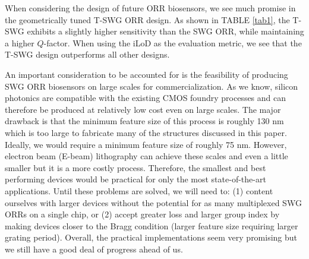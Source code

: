 \documentclass[aps,prl,twocolumn, superscriptaddress,nobalancelastpage]{revtex4}
\begin{document}
When considering the design of future ORR biosensors, we see much promise in the geometrically tuned T-SWG ORR design. As shown in TABLE \ref{tab1}, the T-SWG exhibits a slightly higher sensitivity than the SWG ORR, while maintaining a higher $Q$-factor. When using the iLoD as the evaluation metric, we see that the T-SWG design outperforms all other designs. 


An important consideration to be accounted for is the feasibility of producing SWG ORR biosensors on large scales for commercialization. As we know, silicon photonics are compatible with the existing CMOS foundry processes and can therefore be produced at relatively low cost even on large scales. The major drawback is that the minimum feature size of this process is roughly 130 nm which is too large to fabricate many of the structures discussed in this paper. Ideally, we would require a minimum feature size of roughly 75 nm. However, electron beam (E-beam) lithography can achieve these scales and even a little smaller but it is a more costly process. Therefore, the smallest and best performing devices would be practical for only the most state-of-the-art applications. Until these problems are solved, we will need to: (1) content ourselves with larger devices without the potential for as many multiplexed SWG ORRs on a single chip, or (2) accept greater loss and larger group index by making devices closer to the Bragg condition (larger feature size requiring larger grating period). Overall, the practical implementations seem very promising but we still have a good deal of progress ahead of us.
\end{document}
